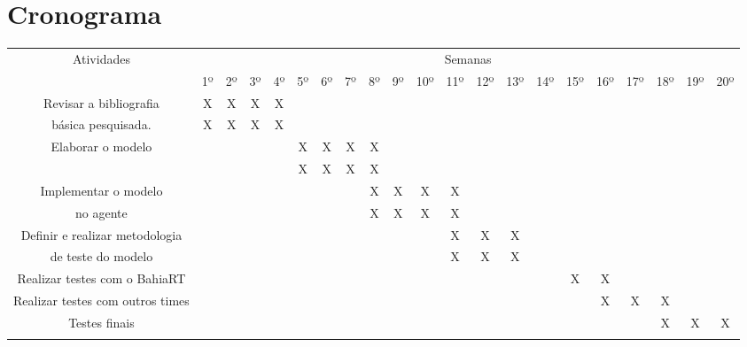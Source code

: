 
\section{Cronograma}
\begin{landscape}
    
    
    \begin{tabular}{|c|| c c c c c c c c c c c c c c c c c c c c|} 
    \hline 
    Atividades & \multicolumn{20}{c|}{Semanas} \\ 
	       & 1º & 2º & 3º & 4º & 5º & 6º & 7º & 8º & 9º & 10º & 11º & 12º & 13º & 14º & 15º & 16º & 17º & 18º & 19º & 20º\\ 
    \hline 
    \hline 
    
    Revisar a bibliografia		&X&X&X&X& & & & & & & & & & & & & & & &  \\%
    básica pesquisada.			&X&X&X&X& & & & & & & & & & & & & & & &  \\
    \hline 
    Elaborar o modelo	 		& & & & &X&X&X&X& & & & & & & & & & & &  \\%
					& & & & &X&X&X&X& & & & & & & & & & & &  \\
   \hline 
    Implementar o modelo 		& & & & & & & &X&X&X&X& & & & & & & & &  \\%
    no agente				& & & & & & & &X&X&X&X& & & & & & & & &  \\
    \hline 
    Definir e realizar metodologia	& & & & & & & & & & &X&X&X& & & & & & &  \\%
    de teste do modelo  		& & & & & & & & & & &X&X&X& & & & & & &  \\
    \hline 
    Realizar testes com o BahiaRT	& & & & & & & & & & & & & & &X&X& & & & \\%
    \hline
    Realizar testes com outros times   & & & & & & & & & & & & & & & &X&X&X& & \\%
    \hline 
    Testes finais			& & & & & & & & & & & & & & & & & &X&X&X \\ \\%
    
\hline
    \end{tabular}
\label{tab:Cronograma}
\end{landscape}	